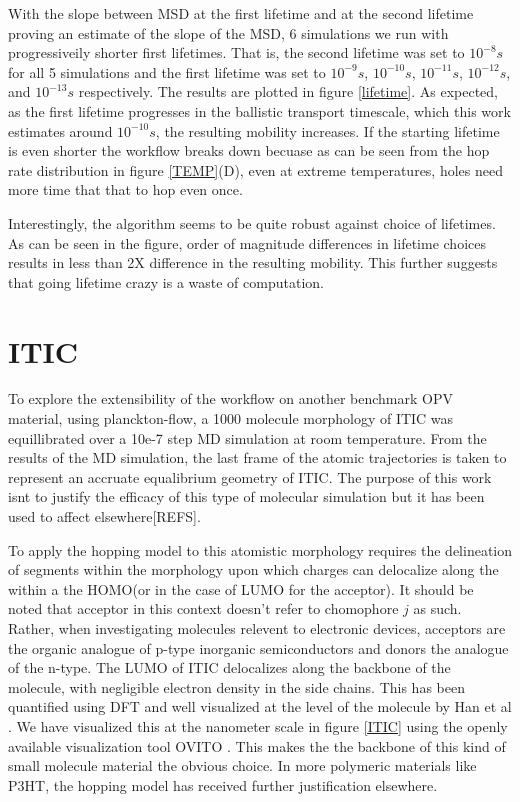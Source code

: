 With the slope between MSD at the first lifetime and at the second lifetime proving an estimate of the slope
of the MSD, 6 simulations we run with progressiveily shorter first lifetimes. That is, the second lifetime was
set to $10^{-8}s$ for all 5 simulations and the first lifetime was set to $10^{-9}s$, $10^{-10}s$,
$10^{-11}s$, $10^{-12}s$, and $10^{-13}s$ respectively. The results are plotted in figure
\ref{lifetime}. As expected, as the first lifetime progresses in the ballistic transport timescale, which this work
estimates around $10^{-10}s$, the resulting mobility increases. If the starting lifetime is even shorter the
workflow breaks down becuase as can be seen from the hop rate distribution in figure \ref{TEMP}(D), even at
extreme temperatures, holes need more time that that to hop even once. 

Interestingly, the algorithm seems to be quite robust against choice of lifetimes. As can be seen in the
figure, order of magnitude differences in lifetime choices results in less than 2X difference in the resulting
mobility. This further suggests that going lifetime crazy is a waste of computation.  

\section{ITIC}

To explore the extensibility of the workflow on another benchmark OPV material, using planckton-flow, a 1000
molecule morphology of ITIC was equillibrated over a 10e-7 step MD simulation at room temperature. From the results of the MD
simulation, the last frame of the atomic trajectories is taken to represent an accruate equalibrium geometry
of ITIC. The purpose of this work isnt to justify the efficacy of this type of molecular simulation but it has
been used to affect elsewhere[REFS].

To apply the hopping model to this atomistic morphology requires the
delineation of segments within the morphology upon which charges can delocalize along the within a the HOMO(or in
the case of LUMO for the acceptor). It should be noted that acceptor in this context doesn't refer to
chomophore $j$ as such. Rather, when investigating molecules relevent to electronic devices, acceptors are the
organic analogue of p-type inorganic semiconductors and donors the analogue of the n-type. 
 The LUMO of ITIC delocalizes along the backbone of the molecule, with
negligible electron density in the side chains. This has been quantified using DFT and well visualized at the
level of the molecule by Han et al \cite{Han2019}. We have visualized this at the nanometer scale in figure \ref{ITIC} using the openly
available visualization tool OVITO \cite{Stukowski2010a}. This makes the the backbone of this kind of small molecule
material the obvious choice. In more polymeric materials like P3HT, the hopping model has received further
justification elsewhere. 

